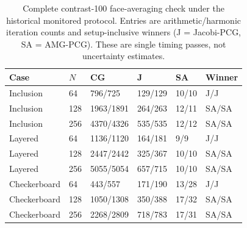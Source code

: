 \begin{table}[htbp]
\centering
\caption{Complete contrast-100 face-averaging check under the historical monitored protocol. Entries are arithmetic/harmonic iteration counts and setup-inclusive winners (J = Jacobi-PCG, SA = AMG-PCG). These are single timing passes, not uncertainty estimates.}
\label{tab:face-main}
\small
\begin{tabular}{llllll}
\toprule
Case & $N$ & CG & J & SA & Winner \\
\midrule
Inclusion & 64 & 796/725 & 129/129 & 10/10 & J/J \\
Inclusion & 128 & 1963/1891 & 264/263 & 12/11 & SA/SA \\
Inclusion & 256 & 4370/4326 & 535/535 & 12/12 & SA/SA \\
Layered & 64 & 1136/1120 & 164/181 & 9/9 & J/J \\
Layered & 128 & 2447/2442 & 325/367 & 10/10 & SA/SA \\
Layered & 256 & 5055/5054 & 657/715 & 10/10 & SA/SA \\
Checkerboard & 64 & 443/557 & 171/190 & 13/28 & J/J \\
Checkerboard & 128 & 1050/1308 & 350/388 & 17/32 & SA/SA \\
Checkerboard & 256 & 2268/2809 & 718/783 & 17/31 & SA/SA \\
\bottomrule
\end{tabular}
\end{table}
